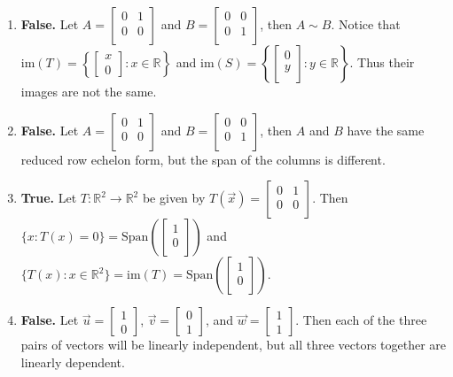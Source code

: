 \documentclass[12pt,letterpaper]{article}
\begin{document}
\begin{enumerate}
\begin{enumerate}
  \item {\bf False.} Let $A=\begin{bmatrix} 0 & 1\\ 0& 0\\ \end{bmatrix}$ and $B=\begin{bmatrix} 0 & 0 \\ 0 & 1\\\end{bmatrix}$, then $A\sim B$. Notice that $\text{im}(T)=\left\{\begin{bmatrix} x\\ 0 \end{bmatrix} : x\in \mathbb{R} \right\}$ and $\text{im}(S) =\left \{ \begin{bmatrix} 0 \\ y\\ \end{bmatrix} : y \in \mathbb{R} \right \}$. Thus their images are not the same.
  
  \item {\bf False.} Let $A=\begin{bmatrix} 0 & 1\\ 0& 0\\ \end{bmatrix}$ and $B=\begin{bmatrix} 0 & 0 \\ 0 & 1\\\end{bmatrix}$, then $A$ and $B$ have the same reduced row echelon form, but the span of the columns is different.
  
  \item {\bf True.} Let $T: \mathbb{R}^2 \to \mathbb{R}^2$ be given by $T(\vec{x})= \begin{bmatrix} 0 & 1\\ 0 &0 \\ \end{bmatrix}$. Then $\{ x: T(x)=0\} = \text{Span}\left( \begin{bmatrix} 1\\ 0\\ \end{bmatrix} \right)$ and 
  $\{T(x): x\in \mathbb{R}^2\} =\text{im}(T)=\text{Span}\left( \begin{bmatrix} 1\\ 0\\ \end{bmatrix} \right)$.
  
  \item {\bf False.} Let $\vec{u} =\begin{bmatrix} 1\\ 0 \end{bmatrix}$, $\vec{v} =\begin{bmatrix} 0\\ 1 \end{bmatrix}$, and $\vec{w} =\begin{bmatrix} 1\\ 1 \end{bmatrix}$. Then each of the three pairs of vectors will be linearly independent, but all three vectors together are linearly dependent.
  

\end{enumerate}
\end{enumerate}
\end{document}
